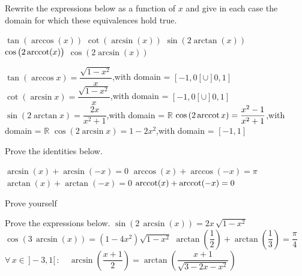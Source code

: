 \ifanalysis
\begin{Exercise} Rewrite the expressions below as a function of $x$ and give in each case the domain for which these equivalences hold true.
\begin{multicols}{2}
    \Question[difficulty = 1] $\tan \left(\arccos (x) \right)$
    \Question[difficulty = 1] $\cot \left(\arcsin (x) \right)$
    \Question[difficulty = 2] $\sin\left(2 \arctan (x) \right)$
    \Question[difficulty = 2] $\cos \left(2 \operatorname{arccot} (x) \right)$
    \Question[difficulty = 1] $\cos \left(2 \arcsin (x) \right)$
    \EndCurrentQuestion
\end{multicols}

\end{Exercise}

\begin{Answer}\phantom{}
    
    \Question $\tan \left(\arccos x \right)=\dfrac{\sqrt{1-x^2}}{x}$,\quad with domain = $[-1,0[\cup]0,1]$
    \Question $\cot \left(\arcsin x \right)=\dfrac{\sqrt{1-x^2}}{x}$,\quad with domain = $[-1,0[\cup]0,1]$
    \Question $\sin\left(2 \arctan x \right)=\dfrac{2x}{x^2+1}$,\quad with domain = $\mathbb{R}$
    \Question $\cos \left(2 \operatorname{arccot} x \right)=\dfrac{x^2-1}{x^2+1}$,\quad with domain = $\mathbb{R}$
    \Question $\cos \left(2 \arcsin x \right)=1-2x^2$,\quad with domain = $[-1,1]$
\end{Answer}

\begin{Exercise} Prove the identities below.
\begin{multicols}{2}
    \Question[difficulty = 1] $\arcsin (x) + \arcsin (-x) = 0$
    \Question[difficulty = 1] $\arccos (x) + \arccos (-x) = \pi$
    \Question[difficulty = 1] $\arctan (x) + \arctan (-x) = 0$
    \Question[difficulty = 1] $\operatorname{arccot} (x) + \operatorname{arccot} (-x) = 0$
    \EndCurrentQuestion
\end{multicols}

\end{Exercise}

\begin{Answer}\phantom{}
    Prove yourself
\end{Answer}

\begin{Exercise} Prove the expressions below. 
	\Question[difficulty = 1] $\sin \left(2\,\arcsin (x)\right)=2x\,  \sqrt{1-x^2}$
	\Question[difficulty = 1] $\cos \left(3\,\arcsin (x)\right)=\left(1-4x^2\right) \sqrt{1-x^2}$
	\Question[difficulty = 1] $\arctan \left(\dfrac{1}{2}\right) + \arctan \left(\dfrac{1}{3}\right) = \dfrac{\pi}{4}$
	\Question[difficulty = 2] $\forall\, x\in\, ]-3,1[\, : \quad \arcsin \left(\dfrac{x+1}{2}\right) = \arctan\left(\dfrac{x+1}{\sqrt{3-2x-x^2}}\right)$
	
\end{Exercise}

